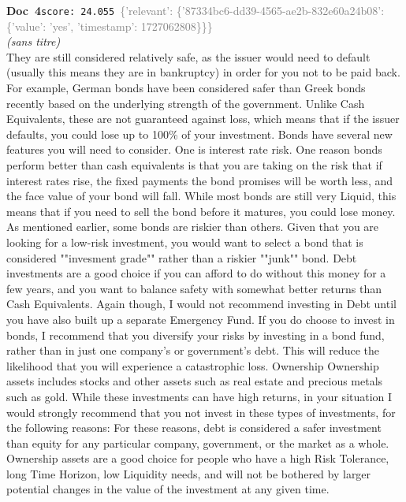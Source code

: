 \documentclass[a4paper,11pt]{article}
\begin{document}
\begin{docenv}
{\footnotesize\textcolor{doccolor}{\textbf{Doc~4}}}\hfill{\tiny\texttt{score:~24.055}}\ {\tiny\textcolor{gray}{\{'relevant': \{'87334bc6-dd39-4565-ae2b-832e60a24b08': \{'value': 'yes', 'timestamp': 1727062808\}\}\}}}\\[3pt]
{\small\textit{(sans titre)}}\\[2pt]
\vspace{2pt}
{\footnotesize 
They are still considered relatively safe, as the issuer would need to default (usually this means they are in bankruptcy) in order for you not to be paid back. For example, German bonds have been considered safer than Greek bonds recently based on the underlying strength of the government. Unlike Cash Equivalents, these are not guaranteed against loss, which means that if the issuer defaults, you could lose up to 100\% of your investment. Bonds have several new features you will need to consider. One is interest rate risk. One reason bonds perform better than cash equivalents is that you are taking on the risk that if interest rates rise, the fixed payments the bond promises will be worth less, and the face value of your bond will fall. While most bonds are still very Liquid, this means that if you need to sell the bond before it matures, you could lose money. As mentioned earlier, some bonds are riskier than others. Given that you are looking for a low-risk investment, you would want to select a bond that is considered ""invesment grade"" rather than a riskier ""junk"" bond. Debt investments are a good choice if you can afford to do without this money for a few years, and you want to balance safety with somewhat better returns than Cash Equivalents. Again though, I would not recommend investing in Debt until you have also built up a separate Emergency Fund. If you do choose to invest in bonds, I recommend that you diversify your risks by investing in a bond fund, rather than in just one company's or government's debt. This will reduce the likelihood that you will experience a catastrophic loss. Ownership Ownership assets includes stocks and other assets such as real estate and precious metals such as gold. While these investments can have high returns, in your situation I would strongly recommend that you not invest in these types of investments, for the following reasons: For these reasons, debt is considered a safer investment than equity for any particular company, government, or the market as a whole. Ownership assets are a good choice for people who have a high Risk Tolerance, long Time Horizon, low Liquidity needs, and will not be bothered by larger potential changes in the value of the investment at any given time.}
\end{docenv}
\end{document}

